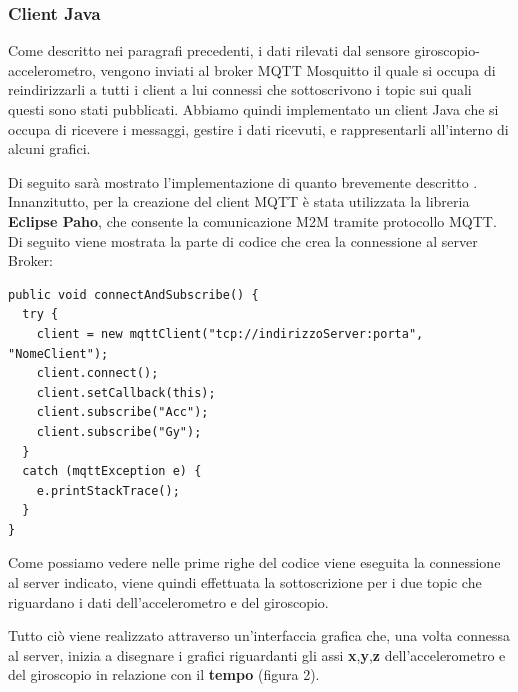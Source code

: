 \documentclass[]{scrartcl}
\begin{document}
\subsubsection{Client Java}

Come descritto nei paragrafi precedenti, i dati rilevati dal sensore giroscopio-accelerometro, vengono inviati al broker MQTT Mosquitto il quale si occupa di reindirizzarli a tutti i client a lui connessi che sottoscrivono i topic sui quali questi sono stati pubblicati. Abbiamo quindi implementato un client Java che si occupa di ricevere i messaggi, gestire i dati ricevuti, e rappresentarli all'interno di alcuni grafici.

Di seguito sarà mostrato l'implementazione di quanto brevemente descritto .
Innanzitutto, per la creazione del client MQTT è stata utilizzata la libreria \textbf{Eclipse Paho}, che consente la comunicazione M2M tramite protocollo MQTT.
Di seguito viene mostrata la parte di codice che crea la connessione al server Broker:

\begingroup
\fontsize{9.5pt}{8pt}\selectfont
\begin{lstlisting}[frame=single]
public void connectAndSubscribe() {
  try {
    client = new mqttClient("tcp://indirizzoServer:porta", "NomeClient");
    client.connect();
    client.setCallback(this);
    client.subscribe("Acc");
    client.subscribe("Gy");
  } 
  catch (mqttException e) {
    e.printStackTrace();
  }
}
\end{lstlisting}
\endgroup

Come possiamo vedere nelle prime righe del codice viene eseguita la connessione al server indicato, viene quindi effettuata la sottoscrizione per i due topic che riguardano i dati dell'accelerometro e del giroscopio.

Tutto ciò viene realizzato attraverso un'interfaccia grafica che, una volta connessa al server, inizia a disegnare i grafici riguardanti gli assi \textbf{x},\textbf{y},\textbf{z} dell'accelerometro e del giroscopio in relazione con il \textbf{tempo} (figura 2).
\end{document}
